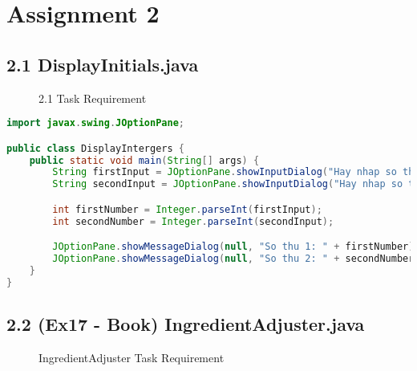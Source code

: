 \documentclass{article}
\begin{document}
\section*{Assignment 2}

\subsection*{2.1 DisplayInitials.java}

\begin{figure}[H]
    \centering
    \caption{2.1 Task Requirement}
\end{figure}

\begin{lstlisting}[language=Java, caption=DisplayInitials.java]
import javax.swing.JOptionPane;

public class DisplayIntergers {
    public static void main(String[] args) {
        String firstInput = JOptionPane.showInputDialog("Hay nhap so thu 1:");
        String secondInput = JOptionPane.showInputDialog("Hay nhap so thu 2:");

        int firstNumber = Integer.parseInt(firstInput);
        int secondNumber = Integer.parseInt(secondInput);

        JOptionPane.showMessageDialog(null, "So thu 1: " + firstNumber);
        JOptionPane.showMessageDialog(null, "So thu 2: " + secondNumber);
    }
}
\end{lstlisting}

\subsection*{2.2 (Ex17 - Book) IngredientAdjuster.java}

\begin{figure}[H]
    \centering
    \caption{IngredientAdjuster Task Requirement}
\end{figure}
\end{document}
